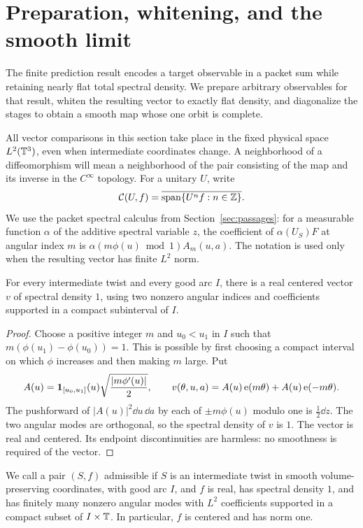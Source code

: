 \section{Preparation, whitening, and the smooth limit}
\label{sec:completion}

The finite prediction result encodes a target observable in a packet
sum while retaining nearly flat total spectral density. We prepare
arbitrary observables for that result, whiten the resulting vector to
exactly flat density, and diagonalize the stages to obtain a smooth map
whose one orbit is complete.

All vector comparisons in this section take place in the fixed physical
space $L^2(\mathbb T^3)$, even when intermediate coordinates change.  A neighborhood
of a diffeomorphism will mean a neighborhood of the pair consisting of the
map and its inverse in the $C^\infty$ topology.  For a unitary $U$, write
\[
 \mathcal C(U,f)=\overline{\operatorname{span}\{U^nf:n\in\mathbb Z\}}.
\]
We use the packet spectral calculus from Section~\ref{sec:passages}:
for a measurable function $\alpha$ of the additive spectral variable $z$, the
coefficient of $\alpha(U_S)F$ at angular index $m$ is
$\alpha(m\phi(u)\bmod1)A_m(u,a)$.  The notation is used only when the resulting
vector has finite $L^2$ norm.

\begin{lemma}\label{lem:flat-vector}
For every intermediate twist and every good arc $I$, there is a real
centered vector $v$ of spectral density $1$, using two nonzero angular
indices and coefficients supported in a compact subinterval of $I$.
\end{lemma}
\begin{proof}
Choose a positive integer $m$ and $u_0<u_1$ in $I$ such that
$m(\phi(u_1)-\phi(u_0))=1$.  This is possible by first choosing a compact
interval on which $\phi$ increases and then making $m$ large.  Put
\[
 A(u)=\mathbf 1_{[u_0,u_1]}(u)
       \sqrt{\frac{|m\phi'(u)|}{2}},
 \qquad
 v(\theta,u,a)=A(u)\operatorname{e}(m\theta)+A(u)\operatorname{e}(-m\theta).
\]
The pushforward of $|A(u)|^2\dd u\,\dd a$ by each of $\pm m\phi(u)$
modulo one is $\tfrac12\dd z$.  The two angular modes are orthogonal,
so the spectral density of $v$ is $1$.  The vector is real and centered.
Its endpoint discontinuities are harmless: no smoothness is required of
the vector.
\end{proof}

We call a pair $(S,f)$ admissible if $S$ is an intermediate twist in
smooth volume-preserving coordinates, with good arc $I$, and $f$ is real,
has spectral density $1$, and has finitely many nonzero angular modes
with $L^2$ coefficients supported in a compact subset of $I\times\mathbb T$.
In particular, $f$ is centered and has norm one.

